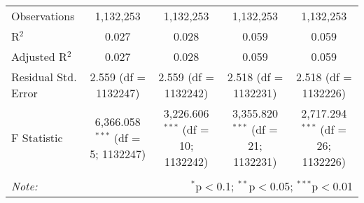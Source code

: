 \documentclass[
]{article}
\begin{document}
\begin{table}[!htbp]
{\begin{tabular}{@{\extracolsep{5pt}}lcccc}
Observations & 1,132,253 & 1,132,253 & 1,132,253 & 1,132,253 \\ 
R$^{2}$ & 0.027 & 0.028 & 0.059 & 0.059 \\ 
Adjusted R$^{2}$ & 0.027 & 0.028 & 0.059 & 0.059 \\ 
Residual Std. Error & 2.559 (df = 1132247) & 2.559 (df = 1132242) & 2.518 (df = 1132231) & 2.518 (df = 1132226) \\ 
F Statistic & 6,366.058$^{***}$ (df = 5; 1132247) & 3,226.606$^{***}$ (df = 10; 1132242) & 3,355.820$^{***}$ (df = 21; 1132231) & 2,717.294$^{***}$ (df = 26; 1132226) \\ 
\hline 
\hline \\[-1.8ex] 
\textit{Note:}  & \multicolumn{4}{r}{$^{*}$p$<$0.1; $^{**}$p$<$0.05; $^{***}$p$<$0.01} \\ 
\end{tabular}
} 
\end{table} 
\newpage
\end{document}
